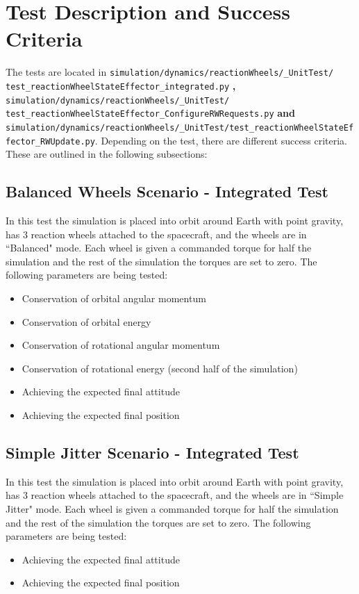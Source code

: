\section{Test Description and Success Criteria}
The tests are located in \texttt{simulation/dynamics/reactionWheels/\_UnitTest/\newline
test\_reactionWheelStateEffector\_integrated.py} \textbf{,} \texttt{simulation/dynamics/reactionWheels/\newline\_UnitTest/
test\_reactionWheelStateEffector\_ConfigureRWRequests.py} \textbf{and} \texttt{simulation/\newline dynamics/reactionWheels/\_UnitTest/test\_reactionWheelStateEffector\_RWUpdate.py}. Depending on the test, there are different success criteria. These are outlined in the following subsections:
\subsection{Balanced Wheels Scenario - Integrated Test}
In this test the simulation is placed into orbit around Earth with point gravity, has 3 reaction wheels attached to the spacecraft, and the wheels are in ``Balanced" mode. Each wheel is given a commanded torque for half the simulation and the rest of the simulation the torques are set to zero. The following parameters are being tested:
\begin{itemize}
	\item Conservation of orbital angular momentum
	\item Conservation of orbital energy
	\item Conservation of rotational angular momentum
	\item Conservation of rotational energy (second half of the simulation)
	\item Achieving the expected final attitude
	\item Achieving the expected final position
\end{itemize}

\subsection{Simple Jitter Scenario - Integrated Test}
In this test the simulation is placed into orbit around Earth with point gravity, has 3 reaction wheels attached to the spacecraft, and the wheels are in ``Simple Jitter" mode. Each wheel is given a commanded torque for half the simulation and the rest of the simulation the torques are set to zero. The following parameters are being tested:
\begin{itemize}
\item Achieving the expected final attitude
\item Achieving the expected final position
\end{itemize}

